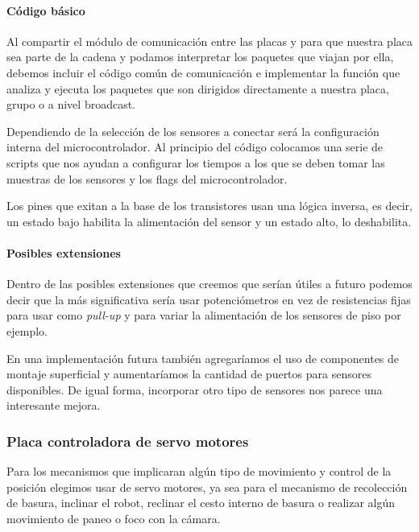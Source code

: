 \paragraph{C\'odigo b\'asico}
\label{h_placas_sensado_codigo}

Al compartir el m\'odulo de comunicaci\'on entre las placas y para que nuestra placa sea parte de la
cadena y podamos interpretar los paquetes que viajan por ella, debemos incluir el c\'odigo com\'un
de comunicaci\'on e implementar la funci\'on que analiza y ejecuta los paquetes que son dirigidos
directamente a nuestra placa, grupo o a nivel broadcast.

Dependiendo de la selecci\'on de los sensores a conectar ser\'a la configuraci\'on interna del microcontrolador.
Al principio del c\'odigo colocamos una serie de scripts que nos ayudan a configurar los tiempos a los que se
deben tomar las muestras de los sensores y los flags del microcontrolador.

Los pines que exitan a la base de los transistores usan una l\'ogica inversa, es decir, un estado bajo habilita
la alimentaci\'on del sensor y un estado alto, lo deshabilita.

\paragraph{Posibles extensiones}
\label{h_placas_sensado_extensiones}

Dentro de las posibles extensiones que creemos que ser\'ian \'utiles a futuro podemos decir que la m\'as
significativa ser\'ia usar potenci\'ometros en vez de resistencias fijas para usar como \emph{pull-up} y
para variar la alimentaci\'on de los sensores de piso por ejemplo.

En una implementaci\'on futura tambi\'en agregar\'iamos el uso de componentes de montaje superficial y
aumentar\'iamos la cantidad de puertos para sensores disponibles.
De igual forma, incorporar otro tipo de sensores nos parece una interesante mejora.

\subsubsection{Placa controladora de servo motores}
\label{h_placas_servos}

Para los mecanismos que implicaran alg\'un tipo de movimiento y control de la posici\'on elegimos usar
de servo motores, ya sea para el mecanismo de recolecci\'on de basura, inclinar el robot, reclinar el
cesto interno de basura o realizar alg\'un movimiento de paneo o foco con la c\'amara.

